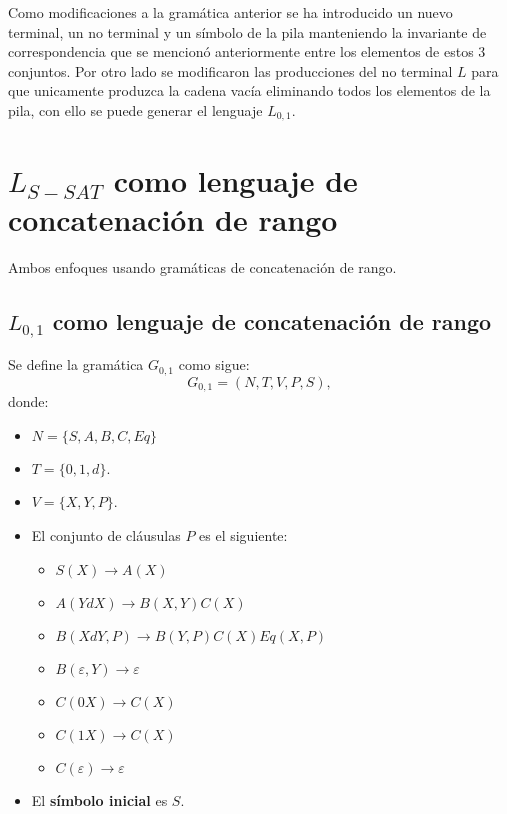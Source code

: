 \documentclass[12pt]{article}
\begin{document}
Como modificaciones a la gramática anterior se ha introducido un nuevo terminal, 
un no terminal y un símbolo de la pila manteniendo la invariante de correspondencia 
que se mencionó anteriormente entre los elementos de estos 3 conjuntos. Por otro lado se modificaron 
las producciones del no terminal $L$ para que unicamente produzca la cadena vacía eliminando todos los elementos de la pila, 
con ello se puede generar el lenguaje $L_{0,1}$.



\section{$L_{S-SAT}$ como lenguaje de concatenación de rango}

Ambos enfoques usando gramáticas de concatenación de rango.

\subsection{$L_{0,1}$ como lenguaje de concatenación de rango}

Se define la gramática $G_{0,1}$ como sigue:
\[
    G_{0,1} = (N, T, V, P, S),
\]
donde:

\begin{itemize}
    \item $N=\{S,A,B,C,Eq\}$
    \item $T=\{0,1,d\}$.
    \item $V=\{X,Y,P\}$.
    \item El conjunto de cláusulas $P$ es el siguiente:
          \begin{itemize}
              \item  $S(X)\to A(X)$
              \item $A(YdX)\to B(X,Y)C(X)$
              \item $B(XdY,P)\to B(Y,P) C(X) Eq(X,P)$
              \item $B(\varepsilon,Y)\to \varepsilon$
              \item $C(0X)\to C(X)$
              \item $C(1X)\to C(X)$
              \item $C(\varepsilon)\to \varepsilon$
          \end{itemize}
    \item El \textbf{símbolo inicial} es $S$.
\end{itemize}
\end{document}
